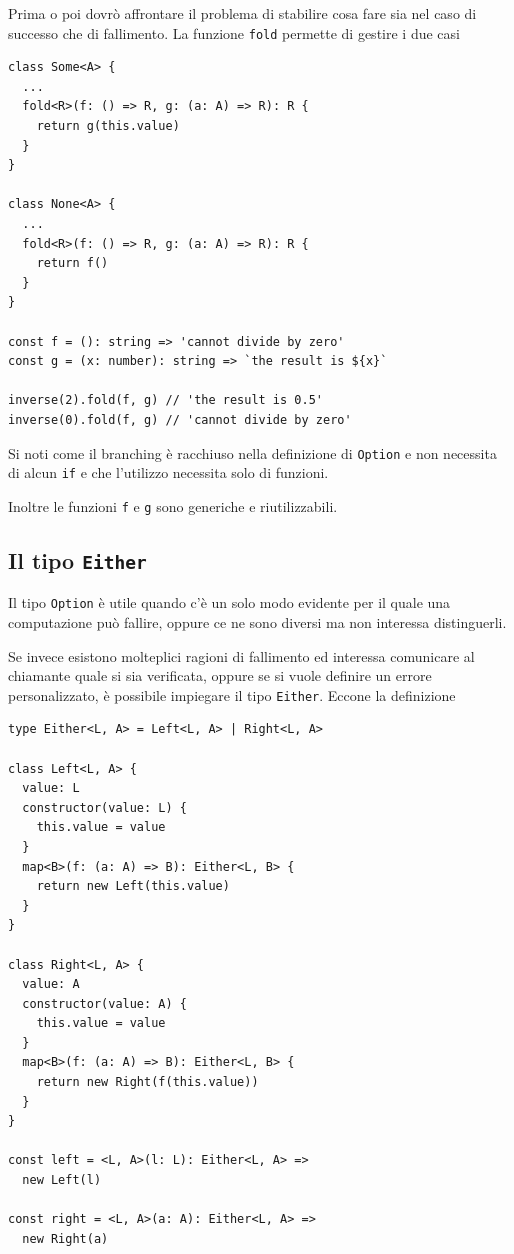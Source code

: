 \documentclass[12pt]{article}
\begin{document}
Prima o poi dovrò affrontare il problema di stabilire cosa fare sia nel caso di successo che di fallimento.
La funzione \texttt{fold} permette di gestire i due casi

\begin{verbatim}
class Some<A> {
  ...
  fold<R>(f: () => R, g: (a: A) => R): R {
    return g(this.value)
  }
}

class None<A> {
  ...
  fold<R>(f: () => R, g: (a: A) => R): R {
    return f()
  }
}

const f = (): string => 'cannot divide by zero'
const g = (x: number): string => `the result is ${x}`

inverse(2).fold(f, g) // 'the result is 0.5'
inverse(0).fold(f, g) // 'cannot divide by zero'
\end{verbatim}

Si noti come il branching è racchiuso nella definizione di \texttt{Option} e non necessita di alcun \texttt{if}
e che l'utilizzo necessita solo di funzioni.

Inoltre le funzioni \texttt{f} e \texttt{g} sono generiche e riutilizzabili.

\subsection{Il tipo \texttt{Either}}

Il tipo \texttt{Option} è utile quando c'è un solo modo evidente per il quale una computazione può fallire,
oppure ce ne sono diversi ma non interessa distinguerli.

Se invece esistono molteplici ragioni di fallimento ed interessa comunicare al chiamante quale si sia verificata,
oppure se si vuole definire un errore personalizzato, è possibile impiegare il tipo \texttt{Either}. Eccone la definizione

\begin{verbatim}
type Either<L, A> = Left<L, A> | Right<L, A>

class Left<L, A> {
  value: L
  constructor(value: L) {
    this.value = value
  }
  map<B>(f: (a: A) => B): Either<L, B> {
    return new Left(this.value)
  }
}

class Right<L, A> {
  value: A
  constructor(value: A) {
    this.value = value
  }
  map<B>(f: (a: A) => B): Either<L, B> {
    return new Right(f(this.value))
  }
}

const left = <L, A>(l: L): Either<L, A> =>
  new Left(l)

const right = <L, A>(a: A): Either<L, A> =>
  new Right(a)
\end{verbatim}
\end{document}
